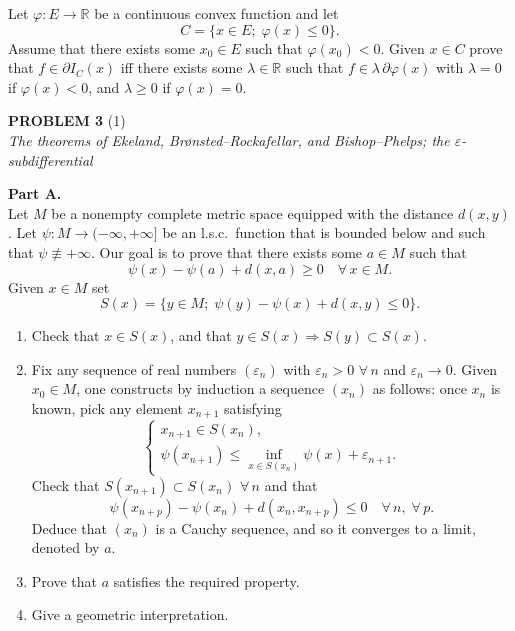\documentclass[12pt]{article}
\newcommand{\R}{\mathbb{R}}
\begin{document}
\medskip

\noindent Let $\varphi : E \to \R$ be a continuous convex function and let
\[
C = \{x \in E;\; \varphi(x) \le 0\}.
\]
Assume that there exists some $x_0 \in E$ such that $\varphi(x_0) < 0$. Given $x \in C$ prove
that $f \in \partial I_C(x)$ iff there exists some $\lambda \in \R$ such that $f \in \lambda\,\partial\varphi(x)$ with
$\lambda = 0$ if $\varphi(x) < 0$, and $\lambda \ge 0$ if $\varphi(x) = 0$.

\bigskip

\noindent\textbf{PROBLEM 3} (1)\\[4pt]
\textit{The theorems of Ekeland, Br\o{}nsted--Rockafellar, and Bishop--Phelps; the $\varepsilon$-subdifferential}

\medskip

\noindent\textbf{Part A.}\\
Let $M$ be a nonempty complete metric space equipped with the distance $d(x,y)$.
Let $\psi : M \to (-\infty,+\infty]$ be an l.s.c.\ function that is bounded below and such that
$\psi \not\equiv +\infty$. Our goal is to prove that there exists some $a \in M$ such that
\[
\psi(x) - \psi(a) + d(x,a) \ge 0 \quad \forall\, x \in M.
\]
Given $x \in M$ set
\[
S(x) = \{y \in M;\; \psi(y) - \psi(x) + d(x,y) \le 0\}.
\]

\begin{enumerate}
\item Check that $x \in S(x)$, and that $y \in S(x) \Rightarrow S(y) \subset S(x)$.

\item Fix any sequence of real numbers $(\varepsilon_n)$ with $\varepsilon_n > 0$ $\forall\, n$ and $\varepsilon_n \to 0$.
Given $x_0 \in M$, one constructs by induction a sequence $(x_n)$ as follows: once $x_n$ is
known, pick any element $x_{n+1}$ satisfying
\[
\begin{cases}
x_{n+1} \in S(x_n),\\[4pt]
\psi(x_{n+1}) \le \displaystyle\inf_{x \in S(x_n)} \psi(x) + \varepsilon_{n+1}.
\end{cases}
\]
Check that $S(x_{n+1}) \subset S(x_n)$ $\forall\, n$ and that
\[
\psi(x_{n+p}) - \psi(x_n) + d(x_n, x_{n+p}) \le 0 \quad \forall\, n,\; \forall\, p.
\]
Deduce that $(x_n)$ is a Cauchy sequence, and so it converges to a limit, denoted by $a$.

\item Prove that $a$ satisfies the required property.


\item Give a geometric interpretation.
\end{enumerate}
\end{document}

